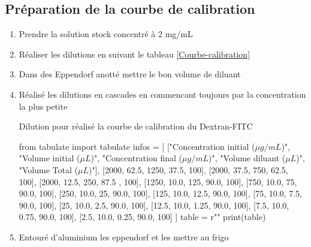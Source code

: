 \subsection{Préparation de la courbe de calibration}

\begin{enumerate}
\item Prendre la solution stock concentré à 2 mg/mL
\item Réaliser les dilutions en suivant le tableau \ref{Courbe-calibration}
\item Dans des Eppendorf anotté mettre le bon volume de diluant
\item Réalisé les dilutions en cascades en commencant toujours par la concentration la plus petite
\begin{table}[H]
\caption{Dilution pour réalisé la courbe de calibration du Dextran-FITC}
\label{Courbe-calibration}
\begin{pycode}

from tabulate import tabulate
infos = [
    ["Concentration initial ($\mu g/mL$)", "Volume initial ($\mu L$)", "Concentration final ($\mu g/mL$)", "Volume diluant ($\mu L$)",  "Volume Total ($\mu L$)"],
    [2000, 62.5, 1250, 37.5, 100],
    [2000, 37.5, 750, 62.5, 100],
    [2000, 12.5, 250, 87.5 , 100],
    [1250, 10.0, 125, 90.0, 100],
    [750, 10.0, 75, 90.0, 100],
    [250, 10.0, 25, 90.0, 100],
    [125, 10.0, 12.5, 90.0, 100],
    [75, 10.0, 7.5, 90.0, 100],
    [25, 10.0, 2.5, 90.0, 100],
    [12.5, 10.0, 1.25, 90.0, 100],
    [7.5, 10.0, 0.75, 90.0, 100],
    [2.5, 10.0, 0.25, 90.0, 100]
]
table = r""
print(table)
\end{pycode}
\label{table-ensemencement}
\end{table}

\item Entouré d'aluminium les eppendorf et les mettre au frigo
\end{enumerate}